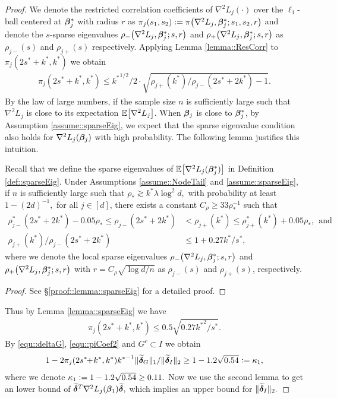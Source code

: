\documentclass[twoside,11pt]{article}
\newcommand{\defeq}{\vcentcolon=}
\newcommand*{\tbdelta}{\tilde \bdelta}
\newcommand*{\bbetas}{\bbeta^*}
\newcommand*{\hessstarss}{\nabla^2 {L_j}(\bbeta^*_{j})}
\newcommand*{\bbetass}{\bbeta^*_{j}}
\begin{document}
\begin{proof}
 We denote the restricted correlation coefficients of $\nabla^2L_j(\cdot)$ over  the $\ell_1$-ball centered at $\bbetas_j$ with radius $r$ as  $\pi_j(s_1,s_2)\defeq \pi\bigl( \nabla^2 L_j  ,\bbetas_j; s_1,s_2,r\bigr)$ and denote the $s$-sparse eigenvalues $\rho_{-}\bigl(\nabla^2 L_j  ,\bbetas_j; s,r\bigr)$ and  $\rho_{+}\bigl(\nabla^2 L_j  ,\bbetas_j; s,r\bigr)$ as $\rho_{j-}(s)$ and $\rho_{j+}(s)$ respectively.
Applying Lemma \ref{lemma::ResCorr} to $\pi_j(2s^*\!\! +\!k^*,k^*)$ we obtain
\begin{align}\label{equ::piCoef}
\pi_j( 2s^*\!\!+\! k^*, k^*) \leq {k^*}^{1/2}/2\cdot \sqrt{ \rho_{j+}(k^*) / \rho_{j-}(2s^* \!\!+\! 2k^*) - 1}.
\end{align} 
By the law of large numbers, if the sample size $n$ is sufficiently large  such that $\nabla^2 L_j $ is close to its expectation $ \mathbb{E} \bigl [\nabla^2 L_j\bigr ]$. When $\bm{\beta}_j $ is close to $\bm{\beta}_j^*$, by Assumption \ref{assume::sparseEig},  we expect that the sparse eigenvalue condition also holds for $\nabla^2 L_j(\bm{\beta}_j)$ with high probability. The following lemma justifies this intuition.


\begin{lemma}\label{lemma::sparseEig}
Recall that we define the sparse eigenvalues of $\EE\bigl[\hessstarss\bigr]$ in Definition \ref{def::sparseEig}.
Under Assumptions \ref{assume::NodeTail} and  \ref{assume::sparseEig}, if $n$ is sufficiently large  such that $\rho_* \gtrsim   k^* \lambda \log^2 d,$  with probability at least $1\!-\!(2d)^{-1}\!,$ for all $j\! \in [d]$, there exists a constant $C_{\rho} \geq 33 \rho_{*}^{-1}$ such that  
\begin{align*}%
\rho_{j-}^*( 2s^*\!\! + \!2 k^*)  - 0.05 \rho_*\leq \rho_{j-}(2s^*\!\!+\! 2k^*) & < \rho_{j+}( k^*)\leq \rho_{j+}^*(k^*) + 0.05 \rho_{*},~~\text{and}\\
\rho_{j+}(k^*)\big /\rho_{j-}(2s^*\! \!+\!2 k^*) & \leq 1 + 0.27k^*/s^*,
\end{align*}
where we denote the local  sparse eigenvalues  $\rho_{-}\bigl(\nabla^2 L_j,\bbetass;s, r\bigr)$ and $\rho_{+}\bigl(\nabla^2 L_j,\bbetass ;s, r\bigr)$ with $r = C_{\rho} \sqrt{\log  d/n}$ as $\rho_{j-}(s )$ and $\rho_{j+}(s )$, respectively. 
\end{lemma}
\begin{proof}
See \S \ref{proof::lemma::sparseEig} for a detailed proof.
\end{proof}
Thus by Lemma \ref{lemma::sparseEig} we have
\begin{align}\label{equ::piCoef2}
 \pi_j( 2s^*\!\!+\! k^*, k^*) \leq  0.5 \sqrt{0.27{k^*}^2\big/{s^*}}.
\end{align}
By \eqref{equ::deltaG}, \eqref{equ::piCoef2} and $G^c\subset I$ we obtain 
\begin{align}\label{equ::piCoef3}
1 - 2 \pi_j( 2s^*\!\!+\! k^*, k^*) {k^*}^{-1}  \|\tbdelta_G \|_1/  \|\tbdelta_I \|_2  \geq  1 - 1.2\sqrt{ 0.54 }   \defeq\kappa_1,
\end{align}
where we denote $\kappa_1 \defeq 1 - 1.2\sqrt{ 0.54 }\geq 0.11.$    
Now we use the second lemma to get an lower bound of $\tbdelta^T \nabla^2 L_j(\bbeta_1)\tbdelta,$  which implies an upper bound for $ \| \tbdelta _I   \|_2.$


\end{proof}
\end{document}
